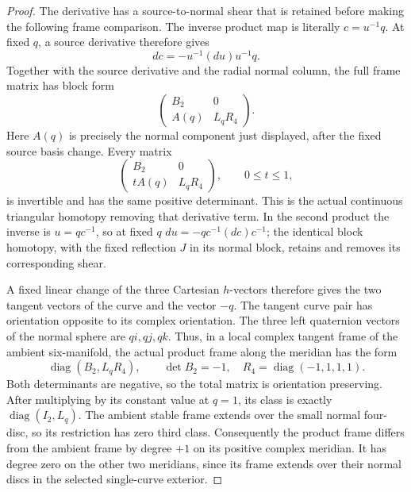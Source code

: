 \begin{proof}
The derivative has a source-to-normal shear that is
retained before making the following frame comparison.
The inverse product map is literally \(c=u^{-1}q\).
At fixed \(q\), a source derivative therefore gives
\[
                   dc=-u^{-1}(du)u^{-1}q.
\]
Together with the source derivative and the radial
normal column, the full frame matrix has block form
\[
       \begin{pmatrix}
         B_2&0\\ A(q)&L_qR_4
       \end{pmatrix}.
\]
Here \(A(q)\) is precisely the normal component just
displayed, after the fixed source basis change.
Every matrix
\[
       \begin{pmatrix}
         B_2&0\\ tA(q)&L_qR_4
       \end{pmatrix},\qquad 0\le t\le1,
\]
is invertible and has the same positive determinant.
This is the actual continuous triangular homotopy
removing that derivative term. In the second product
the inverse is \(u=qc^{-1}\), so at fixed \(q\)
\(du=-qc^{-1}(dc)c^{-1}\); the identical block homotopy,
with the fixed reflection \(J\) in its normal block,
retains and removes its corresponding shear.

A fixed linear change of the three Cartesian \(h\)-vectors
therefore gives the two tangent vectors of the curve and
the vector \(-q\). The tangent curve pair has orientation
opposite to its complex orientation. The three left
quaternion vectors of the normal sphere are \(qi,qj,qk\).
Thus, in a local complex tangent frame of the ambient
six-manifold, the actual product frame along the meridian
has the form
\[
       \operatorname{diag}(B_2,L_q R_4),\qquad
       \det B_2=-1,\quad
       R_4=\operatorname{diag}(-1,1,1,1).
                                                        \tag{P3K.31.4}
\]
Both determinants are negative, so the total matrix is
orientation preserving. After multiplying by its constant
value at \(q=1\), its class is exactly
\(\operatorname{diag}(I_2,L_q)\).
The ambient stable frame extends over the small normal
four-disc, so its restriction has zero third class.
Consequently the product frame differs from the ambient
frame by degree \(+1\) on its positive complex meridian.
It has degree zero on the other two meridians, since its
frame extends over their normal discs in the selected
single-curve exterior.


\end{proof}
